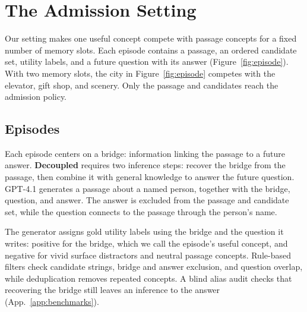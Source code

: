 \section{The Admission Setting}
\label{sec:construction}
\label{sec:benchmarks}

Our setting makes one useful concept compete with passage concepts
for a fixed number of memory slots. Each episode contains a passage,
an ordered candidate set, utility labels, and a future question with
its answer (Figure~\ref{fig:episode}). With two memory slots, the city
in Figure~\ref{fig:episode} competes with the elevator, gift shop, and
scenery. Only the passage and candidates reach the admission policy.

\subsection{Episodes}

Each episode centers on a bridge: information linking the passage to
a future answer. \textbf{Decoupled} requires two inference steps:
recover the bridge from the passage, then combine it with general
knowledge to answer the future question. GPT-4.1 generates a passage
about a named person, together with the bridge, question, and answer.
The answer is excluded from the passage and candidate set, while the
question connects to the passage through the person's name.

The generator assigns gold utility labels using the bridge and the
question it writes: positive for the bridge, which we call the
episode's useful concept, and negative for vivid surface distractors
and neutral passage concepts. Rule-based filters check candidate
strings, bridge and answer exclusion, and question overlap, while
deduplication removes repeated concepts. A blind alias audit checks
that recovering the bridge still leaves an inference to the answer
(App.~\ref{app:benchmarks}).

